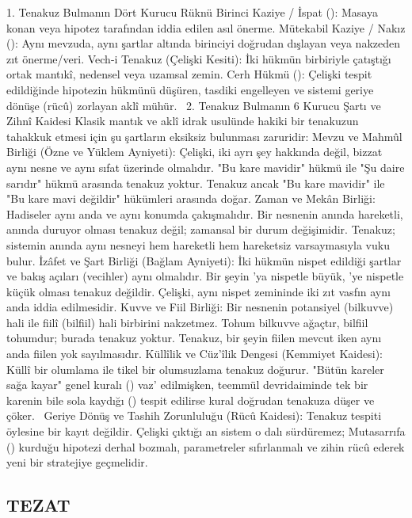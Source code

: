 \documentclass[11pt,a4paper]{article}
\begin{document}
1. Tenakuz Bulmanın Dört Kurucu Rüknü
 Birinci Kaziye / İspat (): Masaya konan veya hipotez tarafından iddia edilen asıl önerme.
 Mütekabil Kaziye / Nakız (): Aynı mevzuda, aynı şartlar altında birinciyi doğrudan dışlayan veya nakzeden zıt önerme/veri.
 Vech-i Tenakuz (Çelişki Kesiti): İki hükmün birbiriyle çatıştığı ortak mantıkî, nedensel veya uzamsal zemin.
 Cerh Hükmü (): Çelişki tespit edildiğinde hipotezin hükmünü düşüren, tasdiki engelleyen ve sistemi geriye dönüşe (rücû) zorlayan aklî mühür.  
2. Tenakuz Bulmanın 6 Kurucu Şartı ve Zihnî Kaidesi
Klasik mantık ve aklî idrak usulünde hakiki bir tenakuzun tahakkuk etmesi için şu şartların eksiksiz bulunması zaruridir:
 Mevzu ve Mahmûl Birliği (Özne ve Yüklem Ayniyeti):
Çelişki, iki ayrı şey hakkında değil, bizzat aynı nesne ve aynı sıfat üzerinde olmalıdır. "Bu kare mavidir" hükmü ile "Şu daire sarıdır" hükmü arasında tenakuz yoktur. Tenakuz ancak "Bu kare mavidir" ile "Bu kare mavi değildir" hükümleri arasında doğar.
 Zaman ve Mekân Birliği:
Hadiseler aynı anda ve aynı konumda çakışmalıdır. Bir nesnenin  anında hareketli,  anında duruyor olması tenakuz değil; zamansal bir durum değişimidir. Tenakuz; sistemin  anında aynı nesneyi hem hareketli hem hareketsiz varsaymasıyla vuku bulur.
 İzâfet ve Şart Birliği (Bağlam Ayniyeti):
İki hükmün nispet edildiği şartlar ve bakış açıları (vecihler) aynı olmalıdır. Bir şeyin 'ya nispetle büyük, 'ye nispetle küçük olması tenakuz değildir. Çelişki, aynı nispet zemininde iki zıt vasfın aynı anda iddia edilmesidir.
 Kuvve ve Fiil Birliği:
Bir nesnenin potansiyel (bilkuvve) hali ile fiilî (bilfiil) hali birbirini nakzetmez. Tohum bilkuvve ağaçtır, bilfiil tohumdur; burada tenakuz yoktur. Tenakuz, bir şeyin fiilen mevcut iken aynı anda fiilen yok sayılmasıdır.
 Küllîlik ve Cüz'îlik Dengesi (Kemmiyet Kaidesi):
Küllî bir olumlama ile tikel bir olumsuzlama tenakuz doğurur. "Bütün kareler sağa kayar" genel kuralı () vaz' edilmişken, teemmül devridaiminde tek bir karenin bile sola kaydığı () tespit edilirse kural doğrudan tenakuza düşer ve çöker.  
 Geriye Dönüş ve Tashih Zorunluluğu (Rücû Kaidesi):
Tenakuz tespiti öylesine bir kayıt değildir. Çelişki çıktığı an sistem o dalı sürdüremez; Mutasarrıfa () kurduğu hipotezi derhal bozmalı, parametreler sıfırlanmalı ve zihin rücû ederek yeni bir stratejiye geçmelidir.



\subsection{TEZAT}
\end{document}

